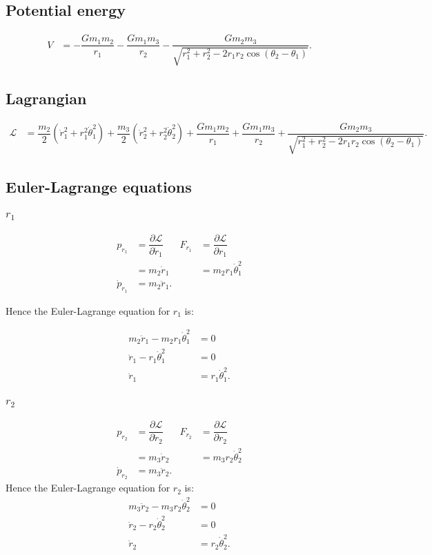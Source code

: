 \documentclass[12pt,a4paper,portrait]{article}
\begin{document}
	\subsection{Potential energy}
	\begin{align*}
		V &= -\dfrac{Gm_1m_2}{r_1} - \dfrac{Gm_1m_3}{r_2} - \dfrac{Gm_2 m_3}{\sqrt{r_1^2 + r_2^2 - 2r_1 r_2 \cos{(\theta_2-\theta_1)}}}.
	\end{align*}
	
	\subsection{Lagrangian}
	\begin{align*}
		\mathcal{L} &= \dfrac{m_2}{2} (\dot{r}_1^2 + r_1^2 \dot{\theta}_1^2) + \dfrac{m_3}{2}(\dot{r}_2^2 + r_2^2 \dot{\theta}_2^2) + \dfrac{Gm_1m_2}{r_1} + \dfrac{Gm_1m_3}{r_2} + \dfrac{Gm_2 m_3}{\sqrt{r_1^2 + r_2^2 - 2r_1 r_2 \cos{(\theta_2-\theta_1)}}}.
	\end{align*}
	
	\subsection{Euler-Lagrange equations}
	\subsubsection{$r_1$}
	\begin{align*}
		p_{r_1} &= \dfrac{\partial \mathcal{L}}{\partial \dot{r}_1} & F_{r_1} &= \dfrac{\partial \mathcal{L}}{\partial r_1} \\
		&= m_2\dot{r}_1 & &= m_2 r_1\dot{\theta}_1^2 \\
		\dot{p}_{r_1} &= m_2\ddot{r}_1.
	\end{align*}
	
	Hence the Euler-Lagrange equation for $r_1$ is:
	
	\begin{align*}
		m_2\ddot{r}_1 - m_2 r_1\dot{\theta}_1^2 &= 0 \\
		\ddot{r}_1 - r_1 \dot{\theta}_1^2 &= 0 \\
		\ddot{r}_1 &= r_1 \dot{\theta}_1^2.
	\end{align*}
		
	\subsubsection{$r_2$}
	\begin{align*}
		p_{r_2} &= \dfrac{\partial \mathcal{L}}{\partial \dot{r}_2} & F_{r_2} &= \dfrac{\partial \mathcal{L}}{\partial r_2} \\
		&= m_3\dot{r}_2 & &= m_3 r_2\dot{\theta}_2^2\\
		\dot{p}_{r_2} &= m_3\ddot{r}_2.
	\end{align*}
	Hence the Euler-Lagrange equation for $r_2$ is:
	\begin{align*}
		m_3 \ddot{r}_2 - m_3 r_2 \dot{\theta}_2^2 &= 0 \\
		\ddot{r}_2 - r_2 \dot{\theta}_2^2 &= 0 \\
		\ddot{r}_2 &= r_2 \dot{\theta}_2^2.
	\end{align*}
	
\end{document}
